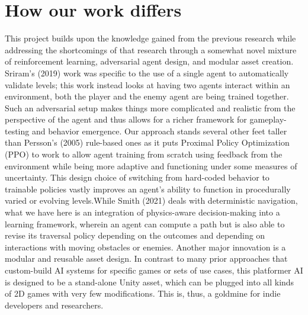 \documentclass[12pt,oneside,openright,a4paper]{cpe-english-project}
\begin{document}
\section{How our work differs}
This project builds upon the knowledge gained from the previous research while addressing the shortcomings of that research through a somewhat novel mixture of reinforcement learning, adversarial agent design, and modular asset creation. Sriram’s (2019) work was specific to the use of a single agent to automatically validate levels; this work instead looks at having two agents interact within an environment, both the player and the enemy agent are being trained together. Such an adversarial setup makes things more complicated and realistic from the perspective of the agent and thus allows for a richer framework for gameplay-testing and behavior emergence.
Our approach stands several other feet taller than Persson’s (2005) rule-based ones as it puts Proximal Policy Optimization (PPO) to work to allow agent training from scratch using feedback from the environment while being more adaptive and functioning under some measures of uncertainty. This design choice of switching from hard-coded behavior to trainable policies vastly improves an agent’s ability to function in procedurally varied or evolving levels.While Smith (2021) deals with deterministic navigation, what we have here is an integration of physics-aware decision-making into a learning framework, wherein an agent can compute a path but is also able to revise its traversal policy depending on the outcomes and depending on interactions with moving obstacles or enemies. Another major innovation is a modular and reusable asset design. In contrast to many prior approaches that custom-build AI systems for specific games or sets of use cases, this platformer AI is designed to be a stand-alone Unity asset, which can be plugged into all kinds of 2D games with very few modifications. This is, thus, a goldmine for indie developers and researchers.



\end{document}
